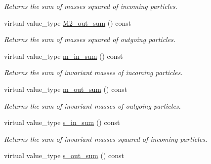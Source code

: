 \begin{DoxyCompactItemize}
\begin{DoxyCompactList}\small\item\em Returns the sum of masses squared of incoming particles. \end{DoxyCompactList}\item 
\hypertarget{a00451_a3e3b85b112e254a2ac650b3f799f4d91}{}virtual value\+\_\+type \hyperlink{a00451_a3e3b85b112e254a2ac650b3f799f4d91}{M2\+\_\+out\+\_\+sum} () const \label{a00451_a3e3b85b112e254a2ac650b3f799f4d91}

\begin{DoxyCompactList}\small\item\em Returns the sum of masses squared of outgoing particles. \end{DoxyCompactList}\item 
\hypertarget{a00451_aafdf99f4cef59c8b5ba3722602f45b84}{}virtual value\+\_\+type \hyperlink{a00451_aafdf99f4cef59c8b5ba3722602f45b84}{m\+\_\+in\+\_\+sum} () const \label{a00451_aafdf99f4cef59c8b5ba3722602f45b84}

\begin{DoxyCompactList}\small\item\em Returns the sum of invariant masses of incoming particles. \end{DoxyCompactList}\item 
\hypertarget{a00451_adfaea04f945f1ad31aab2f5a48830df7}{}virtual value\+\_\+type \hyperlink{a00451_adfaea04f945f1ad31aab2f5a48830df7}{m\+\_\+out\+\_\+sum} () const \label{a00451_adfaea04f945f1ad31aab2f5a48830df7}

\begin{DoxyCompactList}\small\item\em Returns the sum of invariant masses of outgoing particles. \end{DoxyCompactList}\item 
\hypertarget{a00451_a244486e668455fdcf33ffc69f931de7d}{}virtual value\+\_\+type \hyperlink{a00451_a244486e668455fdcf33ffc69f931de7d}{s\+\_\+in\+\_\+sum} () const \label{a00451_a244486e668455fdcf33ffc69f931de7d}

\begin{DoxyCompactList}\small\item\em Returns the sum of invariant masses squared of incoming particles. \end{DoxyCompactList}\item 
\hypertarget{a00451_a41c9b02ba4f0d6489b510e9d91bea8f3}{}virtual value\+\_\+type \hyperlink{a00451_a41c9b02ba4f0d6489b510e9d91bea8f3}{s\+\_\+out\+\_\+sum} () const \label{a00451_a41c9b02ba4f0d6489b510e9d91bea8f3}


\end{DoxyCompactItemize}
